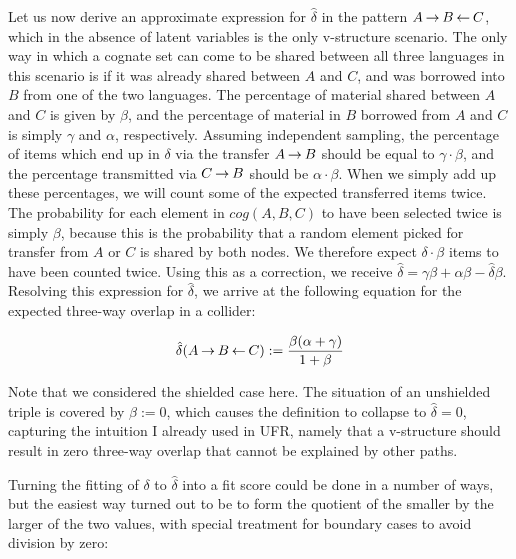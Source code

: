 Let us now derive an approximate expression for $\hat{\delta}$ in the pattern $A \kern 2pt\hbox{$\rightarrow$}\kern 2pt B \kern 2pt\hbox{$\leftarrow$}\kern 2pt C$, which in the absence of latent variables is the only v-structure scenario. The only way in which a cognate set can come to be shared between all three languages in this scenario is if it was already shared between $A$ and $C$, and was borrowed into $B$ from one of the two languages. The percentage of material shared between $A$ and $C$ is given by $\beta$, and the percentage of material in $B$ borrowed from $A$ and $C$ is simply $\gamma$ and $\alpha$, respectively. Assuming independent sampling, the percentage of items which end up in $\delta$ via the transfer $A \kern 2pt\hbox{$\rightarrow$}\kern 2pt B$ should be equal to $\gamma \cdot \beta$, and the percentage transmitted via $C \kern 2pt\hbox{$\rightarrow$}\kern 2pt B$ should be $\alpha \cdot \beta$. When we simply add up these percentages, we will count some of the expected transferred items twice. The probability for each element in $cog(A,B,C)$ to have been selected twice is simply $\beta$, because this is the 
probability that a random element picked for transfer from $A$ or $C$ is shared by both nodes. We therefore expect $\delta \cdot \beta$ items to have been counted twice. Using this as a correction, we receive $\hat{\delta} = \gamma \beta + \alpha \beta - \hat{\delta}\beta$. Resolving this expression for $\hat{\delta}$, we arrive at the following equation for the expected three-way overlap in a collider:

\begin{equation*}
 \hat{\delta}(A \kern 2pt\hbox{$\rightarrow$}\kern 2pt B \kern 2pt\hbox{$\leftarrow$}\kern 2pt C) := \frac{\beta(\alpha + \gamma)}{1 + \beta}
\end{equation*}

Note that we considered the shielded case here. The situation of an unshielded triple is covered by $\beta := 0$, which causes the definition to collapse to $\hat{\delta} = 0$, capturing the intuition I already used in UFR, namely that a v-structure should result in zero three-way overlap that cannot be explained by other paths.

Turning the fitting of $\delta$ to $\hat{\delta}$ into a fit score could be done in a number of ways, but the easiest way turned out to be to form the quotient of the smaller by the larger of the two values, with special treatment for boundary cases to avoid division by zero:

